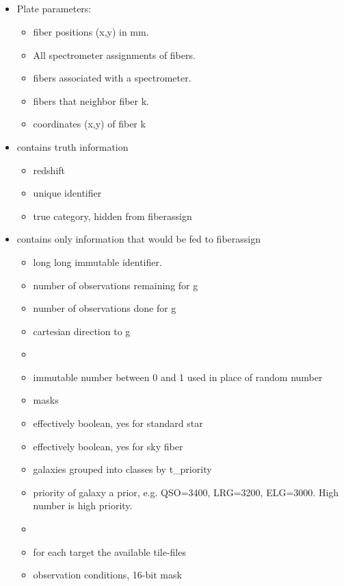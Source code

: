 \documentclass[12pt]{article}
\begin{document}
\subsection{}
\begin{itemize}
\item {}
	Plate parameters:
	\begin{itemize}
		\item {} fiber positions (x,y) in mm.
		\item  {} All spectrometer assignments of fibers.	
		\item {} fibers associated with a spectrometer.
		\item {} fibers that neighbor fiber k.
		\item {} coordinates (x,y) of fiber k
		\end{itemize}
\item {} contains truth information
	\begin{itemize}
		\item {} redshift
		\item {} unique identifier
		\item {} true category, hidden from fiberassign	
		\end{itemize}
\item {} contains only information that would be fed to fiberassign 
	\begin{itemize}
		\item {} long long immutable identifier.
		\item {} number of observations remaining for g
		\item {}  number of observations done for g
		\item {} cartesian direction to g
		\item {} 
		\item {} immutable number between 0 and 1 used in place of random number
		\item {}  masks 		
		\item {} effectively boolean, yes for standard star
		\item {} effectively boolean, yes for sky fiber
		\item {} galaxies grouped into classes by t\_priority
		\item {} priority of galaxy a prior, e.g. QSO=3400, LRG=3200, ELG=3000.  High number is high priority.
		\item {} 
		\item {} for each target the available tile-files
		\item {} observation conditions, 16-bit mask
		

\end{itemize}
\end{itemize}
\end{document}
